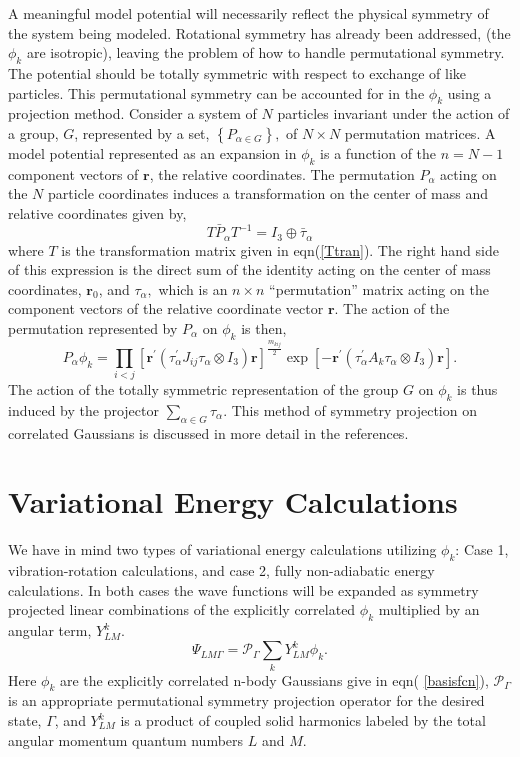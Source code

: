 \documentclass[12pt,thmsa]{article}
\begin{document}
A meaningful model potential will necessarily reflect the physical symmetry
of the system being modeled. Rotational symmetry has already been addressed,
(the $\phi _k$ are isotropic), leaving the problem of how to handle
permutational symmetry. The potential should be totally symmetric with
respect to exchange of like particles. This permutational symmetry can be
accounted for in the $\phi _k$ using a projection method. Consider a system
of $N$ particles invariant under the action of a group, $G$, represented by
a set, $\left\{ P_{\alpha \in G}\right\} ,$ of $N\times N$ permutation
matrices. A model potential represented as an expansion in $\phi _k$ is a
function of the $n=N-1$ component vectors of $\mathbf{r}$, the relative
coordinates. The permutation $P_\alpha $ acting on the $N$ particle
coordinates induces a transformation on the center of mass and relative
coordinates given by, 
\begin{equation}
T\bar{P}_\alpha T^{-1}=I_3\oplus \bar{\tau}_\alpha
\end{equation}
where $T$ is the transformation matrix given in eqn(\ref{Ttran}). The right
hand side of this expression is the direct sum of the identity acting on the
center of mass coordinates, $\mathbf{r}_0$, and $\tau _\alpha ,$ which is an 
$n\times n$ ``permutation'' matrix acting on the component vectors of the
relative coordinate vector $\mathbf{r}$. The action of the permutation
represented by $P_\alpha $ on $\phi _k$ is then, 
\begin{equation}
P_\alpha \phi _k=\prod_{i<j}\left[ \mathbf{r}^{\prime }(\tau _\alpha
^{\prime }J_{ij}\tau _\alpha \otimes I_3)\mathbf{r}\right] ^{\frac{m_{kij}}%
2}\exp \left[ -\mathbf{r}^{\prime }(\tau _\alpha ^{\prime }A_k\tau _\alpha
\otimes I_3)\mathbf{r}\right] .
\end{equation}
The action of the totally symmetric representation of the group $G$ on $\phi
_k$ is thus induced by the projector $\sum_{\alpha \in G}\tau _\alpha .$
This method of symmetry projection on correlated Gaussians is discussed in
more detail in the references\cite{Poshusta83,Kinghorn93,Kinghorn95b}.

\section{Variational Energy Calculations}

We have in mind two types of variational energy calculations utilizing $\phi
_k$: Case 1, vibration-rotation calculations, and case 2, fully
non-adiabatic energy calculations. In both cases the wave functions will be
expanded as symmetry projected linear combinations of the explicitly
correlated $\phi _k$ multiplied by an angular term, $Y_{LM}^k.$ 
\begin{equation}
\Psi _{LM\Gamma }=\mathcal{P}_\Gamma \sum_kY_{LM}^k\phi _k.  \label{wf}
\end{equation}
Here $\phi _k$ are the explicitly correlated n-body Gaussians give in eqn(%
\ref{basisfcn}), $\mathcal{P}_\Gamma $ is an appropriate permutational
symmetry projection operator for the desired state, $\Gamma $, and $Y_{LM}^k$
is a product of coupled solid harmonics labeled by the total angular
momentum quantum numbers $L$ and $M$.
\end{document}
